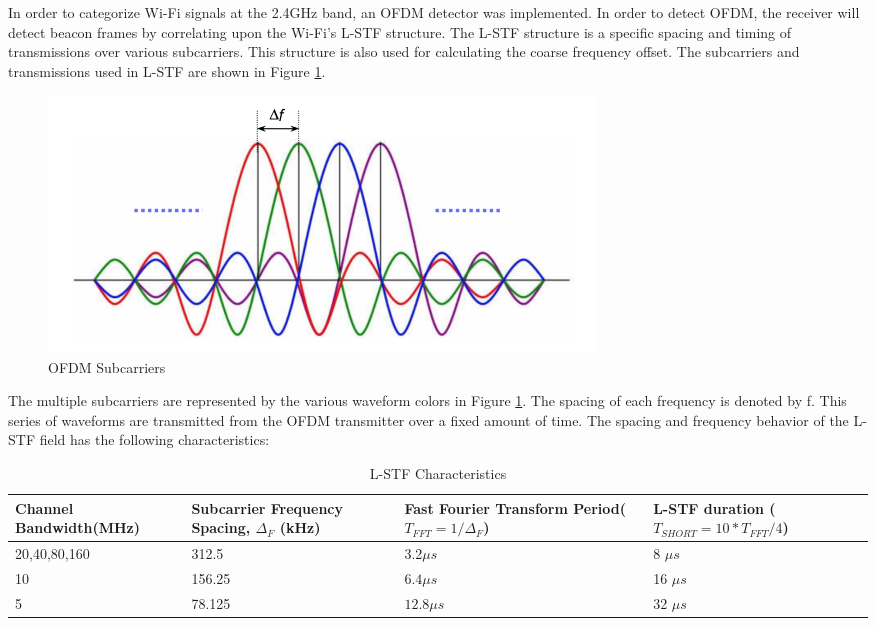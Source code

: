 In order to categorize Wi-Fi signals at the 2.4GHz band, an OFDM detector was implemented. In order to detect OFDM, the receiver will detect beacon frames by correlating upon the Wi-Fi’s L-STF structure. The L-STF structure is a specific spacing and timing of transmissions over various subcarriers. This structure is also used for calculating the coarse frequency offset. The subcarriers and transmissions used in L-STF are shown in Figure \ref{fig:ofdm_subcarriers}. \par 
\begin{figure}[ht!]
	\centering
	\includegraphics[width=0.70\textwidth]{img/ofdm-subcarriers}
	\caption{OFDM Subcarriers}
	\label{fig:ofdm_subcarriers}
\end{figure}\par
The multiple subcarriers are represented by the various waveform colors in Figure \ref{fig:ofdm_subcarriers}. The spacing of each frequency is denoted by f. This series of waveforms are transmitted from the OFDM transmitter over a fixed amount of time. The spacing and frequency behavior of the L-STF field has the following characteristics: \par
\begin{table}[ht!]
	\centering
\begin{tabular}{|p{3.6cm}|p{4cm}|p{4cm}|p{4.5cm}|}
	\hline
	Channel Bandwidth\newline(MHz) & Subcarrier Frequency Spacing, $\Delta_F$ (kHz) &Fast Fourier Transform Period\newline($T_{FFT}=1/\Delta_F$)& L-STF duration \newline($T_{SHORT}=10*T_{FFT}/4$) \\
	\hline
	20,40,80,160 & 312.5 &3.2$\mu s$ &8 $\mu s$ \\
	10 & 156.25 &$6.4\mu s$ &16 $\mu s $\\
	5 & 78.125 &$12.8\mu s$ &32 $\mu s$  \\
	\hline
\end{tabular} 
	\caption{L-STF Characteristics}
	\label{table:spacing}
\end{table} \par 
	
